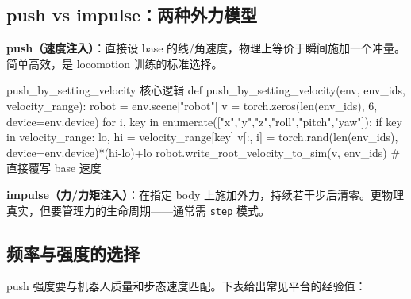 \subsection{push vs impulse：两种外力模型}
\label{sec:rlmc-dr-force-two}

\textbf{push（速度注入）}：直接设 base 的线/角速度，物理上等价于瞬间施加一个冲量。简单高效，是 locomotion 训练的标准选择。

\begin{codebox}[Python]{push\_by\_setting\_velocity 核心逻辑}
def push_by_setting_velocity(env, env_ids, velocity_range):
    robot = env.scene["robot"]
    v = torch.zeros(len(env_ids), 6, device=env.device)
    for i, key in enumerate(["x","y","z","roll","pitch","yaw"]):
        if key in velocity_range:
            lo, hi = velocity_range[key]
            v[:, i] = torch.rand(len(env_ids), device=env.device)*(hi-lo)+lo
    robot.write_root_velocity_to_sim(v, env_ids)     # 直接覆写 base 速度
\end{codebox}

\textbf{impulse（力/力矩注入）}：在指定 body 上施加外力，持续若干步后清零。更物理真实，但要管理力的生命周期——通常需 \verb|step| 模式。


\subsection{频率与强度的选择}
\label{sec:rlmc-dr-force-tune}

push 强度要与机器人质量和步态速度匹配。下表给出常见平台的经验值：

